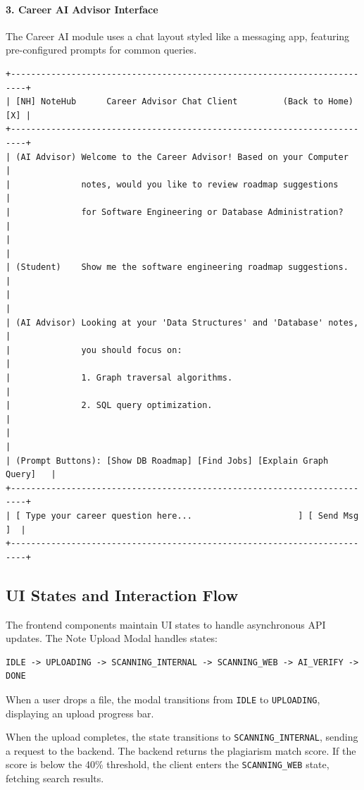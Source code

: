 \documentclass[12,Times new Roman,a4paper]{report}
\begin{document}
\paragraph{3. Career AI Advisor Interface}
The Career AI module uses a chat layout styled like a messaging app, featuring pre-configured prompts for common queries.
\begin{verbatim}
+-------------------------------------------------------------------------+
| [NH] NoteHub      Career Advisor Chat Client         (Back to Home) [X] |
+-------------------------------------------------------------------------+
| (AI Advisor) Welcome to the Career Advisor! Based on your Computer      |
|              notes, would you like to review roadmap suggestions        |
|              for Software Engineering or Database Administration?       |
|                                                                         |
| (Student)    Show me the software engineering roadmap suggestions.      |
|                                                                         |
| (AI Advisor) Looking at your 'Data Structures' and 'Database' notes,   |
|              you should focus on:                                       |
|              1. Graph traversal algorithms.                             |
|              2. SQL query optimization.                                 |
|                                                                         |
| (Prompt Buttons): [Show DB Roadmap] [Find Jobs] [Explain Graph Query]   |
+-------------------------------------------------------------------------+
| [ Type your career question here...                     ] [ Send Msg ]  |
+-------------------------------------------------------------------------+
\end{verbatim}

\subsection{UI States and Interaction Flow}

The frontend components maintain UI states to handle asynchronous API updates. The Note Upload Modal handles states:
\begin{verbatim}
IDLE -> UPLOADING -> SCANNING_INTERNAL -> SCANNING_WEB -> AI_VERIFY -> DONE
\end{verbatim}
When a user drops a file, the modal transitions from \texttt{IDLE} to \texttt{UPLOADING}, displaying an upload progress bar. 

When the upload completes, the state transitions to \texttt{SCANNING\_INTERNAL}, sending a request to the backend. The backend returns the plagiarism match score. If the score is below the 40\% threshold, the client enters the \texttt{SCANNING\_WEB} state, fetching search results. 
\end{document}
